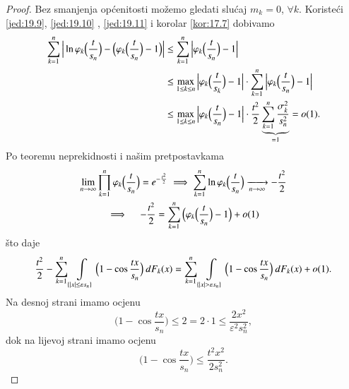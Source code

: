 \begin{proof}
    Bez smanjenja op\' cenitosti mo\v zemo gledati slu\' caj $m_k = 0$, $\forall k$.
    Koriste\' ci \eqref{jed:19.9}, \eqref{jed:19.10} , \eqref{jed:19.11} i korolar \ref{kor:17.7} dobivamo
    \begin{equation*}
        \begin{aligned}
            \sum\limits_{k = 1}^{n} \Big| \ln \varphi_k \Big( \frac{t}{s_n} \Big) - \Big( \varphi_k \Big( \frac{t}{s_n} \Big) - 1  \Big) \Big| &\leq \sum\limits_{k = 1}^{n} \Big| \varphi_k \Big( \frac{t}{s_n} \Big) - 1 \Big|\\
            &\leq \max_{1 \leq k \leq n} \Big| \varphi_k \Big( \frac{t}{s_k} \Big) - 1 \Big| \cdot \sum\limits_{k = 1}^{n} \Big| \varphi_k \Big( \frac{t}{s_n} \Big) -1 \Big|\\
            &\leq \max\limits_{1 \leq k \leq n} \Big| \varphi_k \Big( \frac{t}{s_n} \Big) - 1 \Big| \cdot \frac{t^2}{2} \underbrace{\sum\limits_{k = 1}^{n} \frac{\sigma_k^2}{s_n^2} }_{= 1} = o(1).    
        \end{aligned}
    \end{equation*}
    Po teoremu neprekidnosti i na\v sim pretpostavkama
    \begin{equation*}
        \begin{gathered}
            \lim\limits_{n \to \infty} \prod\limits_{k = 1}^{n} \varphi_k \Big( \frac{t}{s_n} \Big) = e^{-\frac{t^2}{2}} \implies \sum\limits_{k = 1}^{n} \ln \varphi_k \Big( \frac{t}{s_n} \Big) \xrightarrow[n \to \infty]{} -\frac{t^2}{2}\\
            \implies \quad -\frac{t^2}{2} = \sum\limits_{k = 1}^{n} \Big( \varphi_k \Big( \frac{t}{s_n} \Big) -1 \Big) + o(1)
        \end{gathered}
    \end{equation*}
    \v sto daje
    \begin{equation*}
        \frac{t^2}{2} - \sum\limits_{k = 1}^{n} \int\limits_{\{ |x| \leq \varepsilon s_n \}} \Big( 1 - \cos \frac{tx}{s_n} \Big) \: d F_k (x) = \sum\limits_{k = 1}^{n} \int\limits_{\{ |x| > \varepsilon s_n \}} \Big( 1 - \cos \frac{tx}{s_n} \Big) \: d F_k (x) + o(1).
    \end{equation*}
    Na desnoj strani imamo ocjenu
    \begin{equation*}
        \Big( 1 - \cos \frac{tx}{s_n} \Big) \leq 2 = 2 \cdot 1 \leq  \frac{2x^2}{\varepsilon^2 s_n^2},
    \end{equation*}
    dok na lijevoj strani imamo ocjenu
    \begin{equation*}
        \Big( 1 - \cos \frac{tx}{s_n} \Big) \leq \frac{t^2 x^2}{2 s_n^2}.

\end{equation*}
\end{proof}
